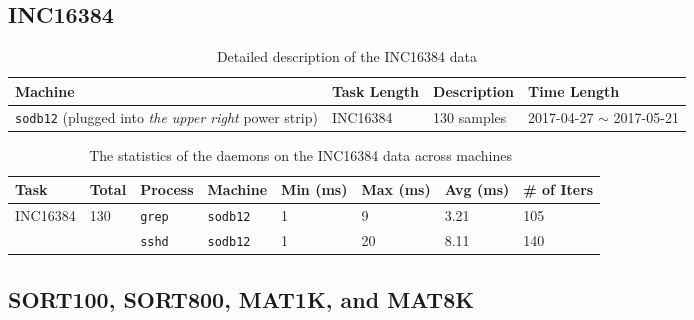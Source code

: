 \documentclass[10pt]{article}
\begin{document}
\clearpage
\newpage
\subsection{INC16384} 

\begin{table}[h]
\begin{center}
\begin{tabular}{|p{4cm}|p{3cm}|p{4cm}|p{4cm}|} \hline
Machine & Task Length & Description & Time Length\\ \hline
{\tt sodb12} (plugged into {\em the upper right} power strip) & INC16384& 130 samples & 2017-04-27 $\sim$ 2017-05-21\\ \hline
\end{tabular}
\end{center}
\vspace{-.2in}
\caption{Detailed description of the INC16384 data \label{tab:exp_notes16384}}
\end{table}

\begin{table}[htp!]
\centering
{\small
 \begin{tabular}{|l|l|l|l|l||l|l|l|} \hline
 Task & Total & Process & Machine & Min (ms) & Max (ms) & Avg (ms) & \# of Iters\\ \hline
 INC16384 & 130 & {\tt grep} & {\tt sodb12} & 1 & 9 & 3.21& 105 \\ \hline
 \hline
  &  & {\tt sshd} & {\tt sodb12} & 1 & 20 & 8.11 & 140 \\ \hline
 \end{tabular}
  }
 \caption{The statistics of the daemons on the INC16384 data across machines~\label{tab:inc16384}}
\end{table}

\clearpage
\newpage
\subsection{SORT100, SORT800, MAT1K, and MAT8K} 
\end{document}
